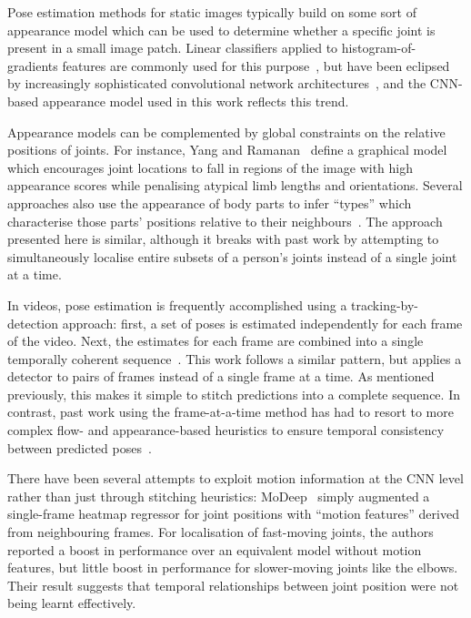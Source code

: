 \documentclass[runningheads]{llncs}
\begin{document}
Pose estimation methods for static images typically build on some sort of
appearance model which can be used to determine whether a specific joint is
present in a small image patch. Linear classifiers applied to
histogram-of-gradients features are commonly used for this
purpose~\cite{yang2011articulated,cherian2014mixing}, but have been eclipsed by
increasingly sophisticated convolutional network
architectures~\cite{jain2014modeep,tompson2014joint,chen2014articulated,pfister2015flowing,wei2016convolutional},
and the CNN-based appearance model used in this work reflects this trend.

Appearance models can be complemented by global constraints on the relative
positions of joints. For instance, Yang and Ramanan~\cite{yang2011articulated}
define a graphical model which encourages joint locations to fall in regions of
the image with high appearance scores while penalising atypical limb lengths and
orientations. Several approaches also use the appearance of body parts to infer
``types'' which characterise those parts' positions relative to their
neighbours~\cite{yang2011articulated,chen2014articulated}. The approach
presented here is similar, although it breaks with past work by attempting to
simultaneously localise entire subsets of a person's joints instead of a single
joint at a time.

In videos, pose estimation is frequently accomplished using a
tracking-by-detection approach: first, a set of poses is estimated independently
for each frame of the video. Next, the estimates for each frame are combined
into a single temporally coherent
sequence~\cite{andriluka2010monocular,ferrari2008progressive,cherian2014mixing,ramanan2005strike}.
This work follows a similar pattern, but applies a detector to pairs of frames
instead of a single frame at a time. As mentioned previously, this makes it
simple to stitch predictions into a complete sequence. In contrast, past work
using the frame-at-a-time method has had to resort to more complex flow- and
appearance-based heuristics to ensure temporal consistency between predicted
poses~\cite{cherian2014mixing}.

There have been several attempts to exploit motion information at the CNN level
rather than just through stitching heuristics: MoDeep~\cite{jain2014modeep}
simply augmented a single-frame heatmap regressor for joint positions with
``motion features'' derived from neighbouring frames. For localisation of
fast-moving joints, the authors reported a boost in performance over an
equivalent model without motion features, but little boost in performance for
slower-moving joints like the elbows. Their result suggests that temporal
relationships between joint position were not being learnt effectively.
\end{document}
